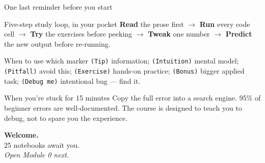 \documentclass[aspectratio=169,11pt]{beamer}
\begin{document}
\begin{frame}{One last reminder before you start}
  \begin{block}{Five-step study loop, in your pocket}
    \textbf{Read} the prose first $\to$ \textbf{Run} every code cell $\to$
    \textbf{Try} the exercises before peeking $\to$ \textbf{Tweak} one number $\to$
    \textbf{Predict} the new output before re-running.
  \end{block}
  \begin{exampleblock}{When to use which marker}
    \texttt{(Tip)} information; \texttt{(Intuition)} mental model;
    \texttt{(Pitfall)} avoid this; \texttt{(Exercise)} hands-on practice;
    \texttt{(Bonus)} bigger applied task; \texttt{(Debug me)} intentional bug — find it.
  \end{exampleblock}
  \begin{alertblock}{When you're stuck for 15 minutes}
    Copy the full error into a search engine. 95\% of beginner errors are
    well-documented. The course is designed to teach you to debug, not to
    spare you the experience.
  \end{alertblock}
\end{frame}

\begin{frame}
  \begin{center}
    {\Huge\bfseries Welcome.}\\[10pt]
    \large 25 notebooks await you.\\[20pt]
    {\large \textit{Open Module 0 next.}}
  \end{center}
\end{frame}
\end{document}
